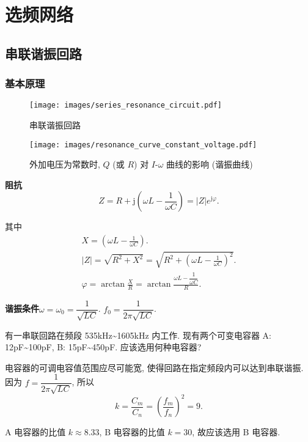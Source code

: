 \section{选频网络}
\subsection{串联谐振回路}
\subsubsection{基本原理}

\begin{figure}[H]
    \centering
    \begin{minipage}{.342\textwidth}
        \centering
        \texttt{[image: images/series\_resonance\_circuit.pdf]}
        \caption{串联谐振回路}
    \end{minipage}
    \qquad
    \centering
    \begin{minipage}{.358\textwidth}
        \centering
        \texttt{[image: images/resonance\_curve\_constant\_voltage.pdf]}
        \caption{外加电压为常数时, $Q$ (或 $R$) 对 $I$-$\omega$ 曲线的影响 (谐振曲线)}
    \end{minipage}
\end{figure}

\textbf{阻抗}
\begin{equation}
    Z=R+\mathrm{j}\left(\omega L-\frac{1}{\omega C}\right)=|Z|e^{\mathrm{j}\varphi}.
\end{equation}

其中
\begin{gather}
    X=\left(\omega L-\frac{1}{\omega C}\right). \\
    |Z|=\sqrt{R^2+X^2}=\sqrt{R^2+\left(\omega L-\frac{1}{\omega C}\right)^2}. \\
    \varphi=\arctan\frac{X}{R}=\arctan\frac{\omega L-\dfrac{1}{\omega C}}{R}.
\end{gather}

\textbf{谐振条件}\quad $\omega=\omega_0=\dfrac{1}{\sqrt{LC}}$. $f_0=\dfrac{1}{2\pi\sqrt{LC}}$.

\begin{exampleprob}
    有一串联回路在频段 535kHz\textasciitilde 1605kHz 内工作. 现有两个可变电容器 A: 12pF\textasciitilde 100pF, B: 15pF\textasciitilde 450pF. 应该选用何种电容器?

    \begin{solution}
        电容器的可调电容值范围应尽可能宽, 使得回路在指定频段内可以达到串联谐振. 因为 $f=\dfrac{1}{2\pi\sqrt{LC}}$, 所以
        \begin{equation*}
            k=\frac{C_m}{C_n}=\left(\frac{f_m}{f_n}\right)^2=9.
        \end{equation*}

        A 电容器的比值 $k\approx 8.33$, B 电容器的比值 $k=30$, 故应该选用 B 电容器.
    \end{solution}
\end{exampleprob}

